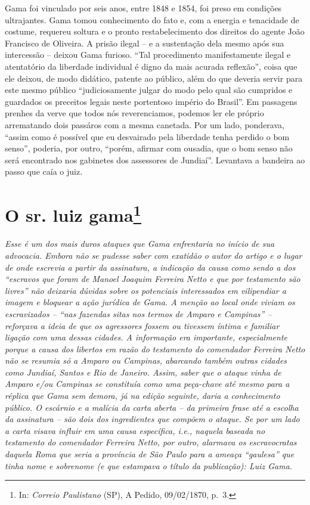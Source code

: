 \begin{argumento}
{Gama foi vinculado por seis anos, entre 1848 e 1854, foi preso em
condições ultrajantes. Gama tomou conhecimento do fato e, com a energia
e tenacidade de costume, requereu soltura e o pronto restabelecimento
dos direitos do agente João Francisco de Oliveira. A prisão ilegal -- e
a sustentação dela mesmo após sua intercessão -- deixou Gama furioso.
``Tal procedimento manifestamente ilegal e atentatório da liberdade
individual é digno da mais acurada reflexão'', coisa que ele deixou, de
modo didático, patente ao público, além do que deveria servir para este
mesmo público ``judiciosamente julgar do modo pelo qual são cumpridos e
guardados os preceitos legais neste portentoso império do Brasil''. Em
passagens prenhes da verve que todos nós reverenciamos, podemos ler ele
próprio arrematando dois passáros com a mesma canetada. Por um lado,
ponderava, ``assim como é possível que eu desvairado pela liberdade tenha
perdido o bom senso'', poderia, por outro, ``porém, afirmar com ousadia,
que o bom senso não será encontrado nos gabinetes dos assessores de
Jundiaí''. Levantava a bandeira ao passo que caía o juiz.}
\end{argumento}

\chapter{O sr. luiz gama\footnote{ In: \emph{Correio Paulistano} (SP), A Pedido, 09/02/1870,
  p.~3.}} %

\begin{didascalia}
\emph{Esse é um dos mais duros ataques que Gama enfrentaria no início de
sua advocacia. Embora não se pudesse saber com exatidão o autor do
artigo e o lugar de onde escrevia a partir da assinatura, a indicação da
causa como sendo a dos ``escravos que foram de Manoel Joaquim Ferreira
Netto e que por testamento são livres'' não deixaria dúvidas sobre os
potenciais interessados em vilipendiar a imagem e bloquear a ação
jurídica de Gama. A menção ao local onde viviam os escravizados -- ``nas
fazendas sitas nos termos de Amparo e Campinas'' -- reforçava a ideia de
que os agressores fossem ou tivessem íntima e familiar ligação com uma
dessas cidades. A informação era importante, especialmente porque a
causa dos libertos em razão do testamento do comendador Ferreira Netto
não se resumia só a Amparo ou Campinas, abarcando também outras cidades
como Jundiaí, Santos e Rio de Janeiro. Assim, saber que o ataque vinha
de Amparo e/ou Campinas se constituía como uma peça-chave até mesmo para
a réplica que Gama sem demora, já na edição seguinte, daria a
conhecimento público. O escárnio e a malícia da carta aberta -- da
primeira frase até a escolha da assinatura -- são dois dos ingredientes
que compõem o ataque. Se por um lado a carta visava influir em uma causa
específica, i.e., naquela baseada no testamento do comendador Ferreira
Netto, por outro, alarmava os escravocratas daquela Roma que seria a
província de São Paulo para a ameaça ``gaulesa'' que tinha nome e sobrenome
(e que estampava o título da publicação): Luiz Gama.}
\end{didascalia}

